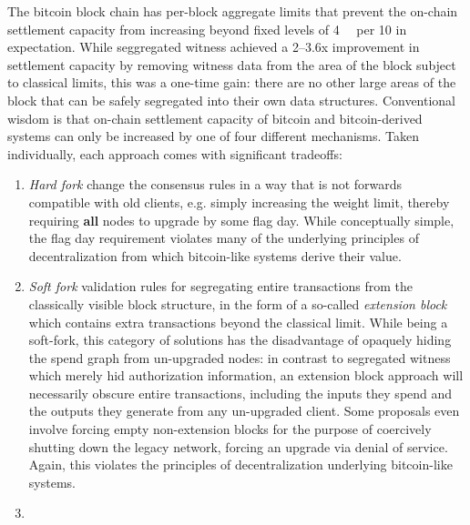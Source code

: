 The bitcoin block chain has per-block aggregate limits that prevent
the on-chain settlement capacity from increasing beyond fixed levels
of \SI{4}{\mega\weight} per \SI{10}{\min} in expectation.  While
seggregated witness achieved a \numrange{2}{3.6}x improvement in
settlement capacity by removing witness data from the area of the
block subject to classical limits, this was a one-time gain: there are
no other large areas of the block that can be safely segregated into
their own data structures.  Conventional wisdom is that on-chain
settlement capacity of bitcoin and bitcoin-derived systems can only be
increased by one of four different mechanisms.  Taken individually,
each approach comes with significant tradeoffs:

\begin{enumerate}

  \item

    \emph{Hard fork} change the consensus rules in a way that is not
    forwards compatible with old clients, e.g. simply increasing the
    weight limit, thereby requiring \textbf{all} nodes to upgrade by
    some flag day.  While conceptually simple, the flag day
    requirement violates many of the underlying principles of
    decentralization from which bitcoin-like systems derive their
    value.

  \item

    \emph{Soft fork} validation rules for segregating entire
    transactions from the classically visible block structure, in the
    form of a so-called \emph{extension block} which contains extra
    transactions beyond the classical limit.  While being a soft-fork,
    this category of solutions has the disadvantage of opaquely hiding
    the spend graph from un-upgraded nodes: in contrast to segregated
    witness which merely hid authorization information, an extension
    block approach will necessarily obscure entire transactions,
    including the inputs they spend and the outputs they generate from
    any un-upgraded client.  Some proposals even involve forcing empty
    non-extension blocks for the purpose of coercively shutting down
    the legacy network, forcing an upgrade via denial of service.
    Again, this violates the principles of decentralization underlying
    bitcoin-like systems.

  \item


\end{enumerate}
